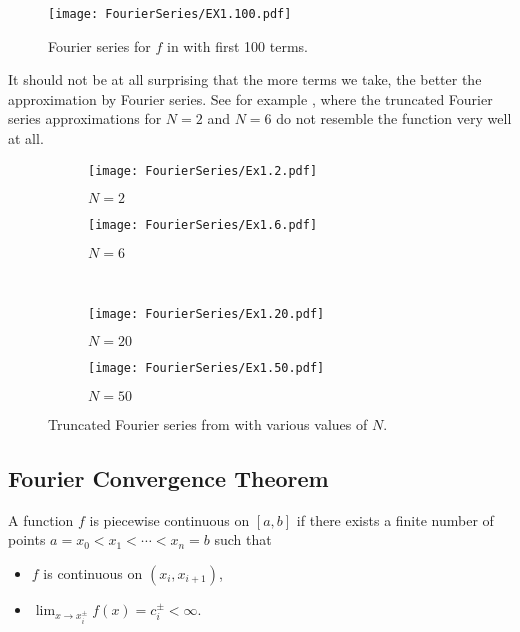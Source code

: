 \begin{figure}[!ht]
	\centering
	\texttt{[image: FourierSeries/EX1.100.pdf]}
	\caption{Fourier series for $f$ in  with first 100 terms.}
	\label{fig:fouriereg100}
\end{figure}

It should not be at all surprising that the more terms we take, the better the approximation by Fourier series. See for example , where the truncated Fourier series approximations for $N=2$ and $N=6$ do not resemble the function very well at all.

\begin{figure}[!ht]
	\centering
	\begin{subfigure}[b]{0.49\textwidth}
		\centering
		\texttt{[image: FourierSeries/Ex1.2.pdf]}
		\caption{$N=2$}
	\end{subfigure}
	\hfill
	\begin{subfigure}[b]{0.49\textwidth}
		\centering
		\texttt{[image: FourierSeries/Ex1.6.pdf]}
		\caption{$N=6$}
	\end{subfigure}
	\\
	\begin{subfigure}[b]{0.49\textwidth}
		\centering
		\texttt{[image: FourierSeries/Ex1.20.pdf]}
		\caption{$N=20$}
	\end{subfigure}
	\hfill
	\begin{subfigure}[b]{0.49\textwidth}
		\centering
		\texttt{[image: FourierSeries/Ex1.50.pdf]}
		\caption{$N=50$}
	\end{subfigure}
	\caption{Truncated Fourier series from  with various values of $N$.}
	\label{fig:fourieregsub}
\end{figure}

\subsection{Fourier Convergence Theorem}

\begin{definition}
	A function $f$ is piecewise continuous on $[a,b]$ if there exists a finite number of points $a = x_0 < x_1 < \cdots < x_n = b$ such that
	\begin{itemize}
		\item $f$ is continuous on $(x_i, x_{i+1})$,
		\item $\lim_{x \to x_i^{\pm}} f(x) = c_i^{\pm} < \infty$.
	\end{itemize}
\end{definition}

